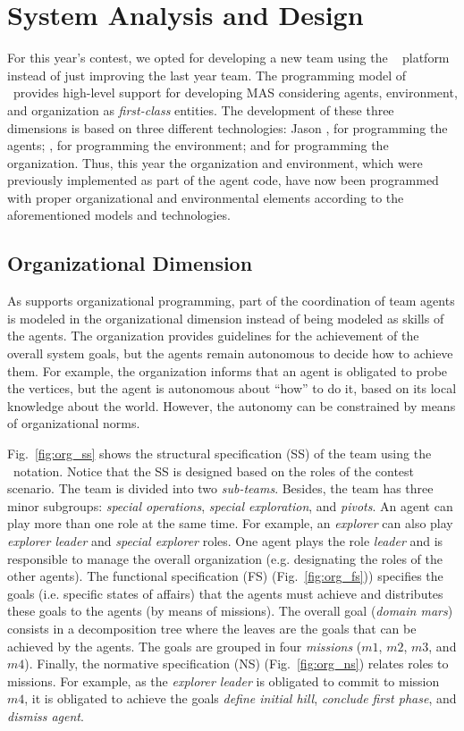 \section{System Analysis and Design}
\label{analysis}

For this year's contest, we opted for developing a new team using the \jacamo~\cite{boissier:2011} platform instead of just improving the last year team. The programming model of \jacamo\ provides high-level support for developing MAS considering agents, environment, and organization as \emph{first-class} entities. The development of these three dimensions is based on three different technologies: Jason \cite{bordini:2007}, for programming the agents; \cartago \cite{ricci:2011}, for programming the environment; and \moise \cite{hubner:2007} for programming the organization. Thus, this year the organization and environment, which were previously implemented as part of the agent code, have now been programmed with proper organizational and environmental elements according to the aforementioned models and technologies.

\subsection{Organizational Dimension}

As \jacamo supports organizational programming, part of the coordination of team agents is modeled in the organizational dimension instead of being modeled as skills of the agents. The organization provides guidelines for the achievement of the overall system goals, but the agents remain autonomous to decide how to achieve them. For example, the organization informs that an agent is obligated to probe the vertices, but the agent is autonomous about ``how'' to do it, based on its local knowledge about the world. However, the autonomy can be constrained by means of organizational norms.

Fig.~\ref{fig:org_ss} shows the structural specification (SS) of the team using the \moise\ notation. Notice that the SS is designed based on the roles of the contest scenario. The team is divided into two \emph{sub-teams}. Besides, the team has three minor subgroups: \emph{special operations}, \emph{special exploration}, and \emph{pivots}. An agent can play more than one role at the same time. For example, an \emph{explorer} can also play \emph{explorer leader} and \emph{special explorer} roles. One agent plays the role \emph{leader} and is responsible to manage the overall organization (e.g. designating the roles of the other agents). The functional specification (FS) (Fig.~\ref{fig:org_fs})) specifies the goals (i.e. specific states of affairs) that the agents must achieve and distributes these goals to the agents (by means of missions). The overall goal (\emph{domain mars}) consists in a decomposition tree where the leaves are the goals that can be achieved by the agents. The goals are grouped in four \emph{missions} ($m1$, $m2$, $m3$, and $m4$). Finally, the normative specification (NS) (Fig.~\ref{fig:org_ns}) relates roles to missions. For example, as the \emph{explorer leader} is obligated to commit to mission $m4$, it is obligated to achieve the goals \emph{define initial hill}, \emph{conclude first phase}, and \emph{dismiss agent}.

